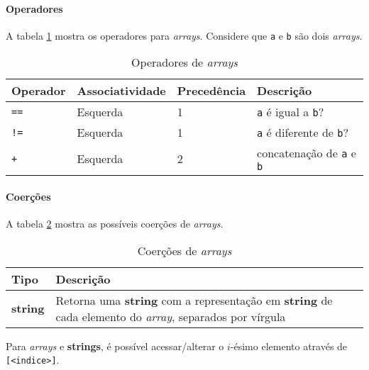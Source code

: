 \paragraph{Operadores} A tabela \ref{tab:operadores-array} mostra os operadores para \textit{arrays}. Considere que \texttt{a} e \texttt{b} são dois \textit{arrays}.
\begin{table}[!h]
    \begin{tabular}{@{}llll@{}}
        \toprule
        Operador    & Associatividade & Precedência & Descrição                               \\ \midrule
        \texttt{==} & Esquerda        & 1           & \texttt{a} é igual a \texttt{b}?        \\
        \texttt{!=} & Esquerda        & 1           & \texttt{a} é diferente de \texttt{b}?   \\
        \texttt{+}  & Esquerda        & 2           & concatenação de \texttt{a} e \texttt{b} \\
    \end{tabular}
    \caption{Operadores de \textit{arrays}}
    \label{tab:operadores-array}
\end{table}

\paragraph{Coerções} A tabela \ref{tab:coercoes-array} mostra as possíveis coerções de \textit{arrays}.
\begin{table}[!h]
    \begin{tabular}{@{}ll@{}}
        \toprule
        Tipo            & Descrição                                                                                                                    \\ \midrule
        \textbf{string} & Retorna uma \textbf{string} com a representação em \textbf{string} de cada elemento do \textit{array}, separados por vírgula \\ \bottomrule
    \end{tabular}
    \caption{Coerções de \textit{arrays}}
    \label{tab:coercoes-array}
\end{table}

Para \textit{arrays} e \textbf{strings}, é possível acessar/alterar o $i$-ésimo elemento através de \texttt{[<indice>]}.